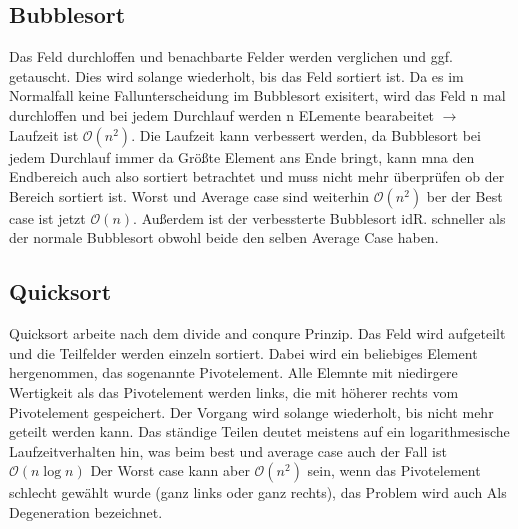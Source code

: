 \documentclass[a4paper]{scrartcl}
\begin{document}
        \subsection{Bubblesort}
            Das Feld durchloffen und benachbarte Felder werden verglichen und ggf. getauscht. Dies wird solange wiederholt, bis das Feld sortiert ist. Da es im Normalfall
            keine Fallunterscheidung im Bubblesort exisitert, wird das Feld n mal durchloffen und bei jedem Durchlauf werden n ELemente bearabeitet \(\rightarrow\) 
            Laufzeit ist \(\mathcal{O}(n^2)\). Die Laufzeit kann verbessert werden, da Bubblesort bei jedem Durchlauf immer da Größte Element ans Ende bringt, 
            kann mna den Endbereich auch also sortiert betrachtet und muss nicht mehr überprüfen ob der Bereich sortiert ist.  Worst und Average case sind weiterhin
            \(\mathcal{O}(n^2)\) ber der Best case ist jetzt \(\mathcal{O}(n)\). Außerdem ist der verbessterte Bubblesort idR. schneller als der normale Bubblesort
            obwohl beide den selben Average Case haben.
        \subsection{Quicksort}
            Quicksort arbeite nach dem divide and conqure Prinzip. Das Feld wird aufgeteilt und die Teilfelder werden einzeln sortiert. Dabei wird ein
            beliebiges Element hergenommen, das sogenannte Pivotelement. Alle Elemnte mit niedirgere Wertigkeit als das Pivotelement werden links,
            die mit höherer rechts vom Pivotelement gespeichert. Der Vorgang wird solange wiederholt, bis nicht mehr geteilt werden kann. 
            Das ständige Teilen deutet meistens auf ein logarithmesische Laufzeitverhalten hin, was beim best und average case auch der Fall ist \(\mathcal{O}(n \log n)\)
            Der Worst case kann aber \(\mathcal{O}(n^2)\) sein, wenn das Pivotelement schlecht gewählt wurde (ganz links oder ganz rechts), das Problem wird 
            auch Als Degeneration bezeichnet.
\end{document}
